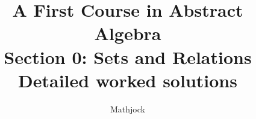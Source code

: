 
\title{\textbf{A First Course in Abstract Algebra}\\[0.3em]Section 0: Sets and Relations\\[0.3em]\large Detailed worked solutions}
\author{Mathjock}
\date{}

\maketitle
\bookinfo
\tableofcontents
\clearpage
\renewcommand{\thesection}{0}
\renewcommand{\theHsection}{fraleigh.0}


